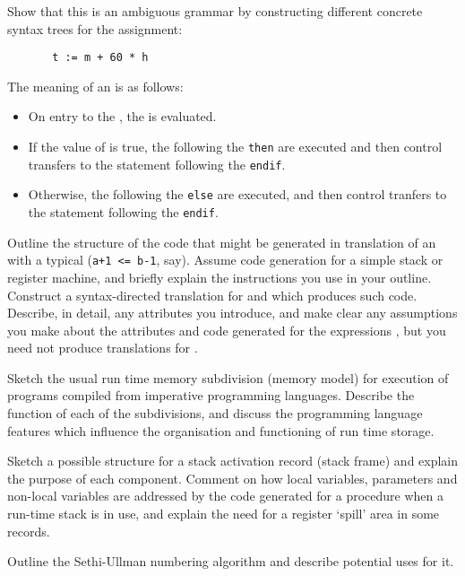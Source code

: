 \begin{subquestions}
\subsubquestion
Show that this is an ambiguous grammar by constructing different
concrete syntax trees for the assignment: 
\begin{verbatim}
       t := m + 60 * h
\end{verbatim}
\subquestion
The meaning of an  is as follows:
\begin{itemize}
\item On entry to the , the  is 
        evaluated. 
\item If the value of  is true,
        the  following the \verb"then" are
        executed and then control transfers to the statement following
        the \verb"endif". 
\item Otherwise, the  following the \verb"else" are
        executed,
        and then control tranfers to the statement following
        the \verb"endif".
\end{itemize}
\begin{subsubquestions}
\subsubquestion
	Outline the structure of the
        code that might be generated in translation of
        an  with a typical  (\verb"a+1 <= b-1", say). 
	Assume code generation for a simple
        stack or register machine, and briefly explain the
	instructions you use in your outline.
\subsubquestion
        Construct a syntax-directed translation for 
         and  which produces such code.
        Describe, in detail, any attributes you
        introduce, and make clear any assumptions you make about 
        the attributes and code generated for the
        expressions , but you need not produce translations for
	.
\end{subsubquestions}

\end{subquestions}

\question

\begin{subquestions}
\subquestion
Sketch the usual run time memory
subdivision (memory model) for execution of
programs compiled from imperative programming
languages. Describe the function of each
of the subdivisions, and discuss
the programming language features which influence
the organisation and functioning of run time storage.

\subquestion
Sketch a possible structure for a stack activation
record (stack frame) and explain the purpose of
each component. Comment on how local variables,
parameters and non-local variables
are addressed by the code generated for a
procedure when a run-time stack is in use,
and explain the need for a register `spill' area
in some records.

\subquestion
Outline 
the Sethi-Ullman numbering algorithm and describe potential 
uses for it.

\end{subquestions}

